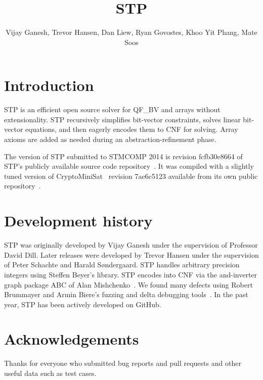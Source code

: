\documentclass{llncs}
\begin{document}
\title{STP}
\author{Vijay Ganesh, Trevor Hansen, Dan Liew, Ryan Govostes, Khoo Yit Phang, Mate Soos}
\institute{}

\maketitle
\thispagestyle{empty}
\pagestyle{empty}

\section{Introduction}
STP\cite{Vijay:Thesis:2007} is an efficient open source solver for QF\_BV and arrays without extensionality. STP recursively simplifies bit-vector constraints, solves linear bit-vector equations, and then eagerly encodes them to CNF for solving. Array axioms are added as needed during an abstraction-refinement phase.

The version of STP submitted to STMCOMP 2014 is revision fcfb30e8664 of STP's publicly available source code repository~\cite{STP:github}. It was compiled with a slightly tuned version of CryptoMiniSat~\cite{DBLP:conf/sat/SoosNC09} revision 7ae6c5123 available from its own public repository~\cite{CMS:github}.


\section{Development history}
STP was originally developed by Vijay Ganesh under the supervision of Professor David Dill. Later releases were developed by Trevor Hansen under the supervision of Peter Schachte and Harald Søndergaard. STP handles arbitrary precision integers using Steffen Beyer's library. STP encodes into CNF via the and-inverter graph package ABC of Alan Mishchenko~\cite{Brayton:2010:AAI:2144310.2144317}. We found many defects using Robert Brummayer and Armin Biere's fuzzing and delta debugging tools~\cite{Brummayer:2009:FDS:1670412.1670413}. In the past year, STP has been actively developed on GitHub.

\section*{Acknowledgements}
Thanks for everyone who submitted bug reports and pull requests and other useful data such as test cases.




\vfill
\pagebreak
\end{document}
